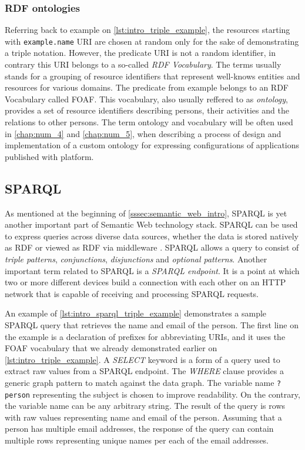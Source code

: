 \subsubsection{RDF ontologies}

Referring back to example on  \autoref{lst:intro_triple_example}, the resources starting with \texttt{example.name} URI are chosen at random only for the sake of demonstrating a triple notation. However, the predicate URI is not a random identifier, in contrary this URI belongs to a so-called \textit{RDF Vocabulary}. The terms usually stands  for a grouping of resource identifiers that represent well-knows entities and resources for various domains. The predicate from example belongs to an RDF Vocabulary called \gls{FOAF}. This vocabulary, also usually reffered  to as \textit{ontology}, provides a set of resource identifiers describing persons, their activities and the relations to other persons. The term ontology and vocabulary will be often used in \autoref{chap:num_4} and \autoref{chap:num_5}, when describing a process of design and implementation of a custom ontology for expressing configurations of applications published with \lpa{} platform.

\subsection{SPARQL}

As mentioned at the beginning of \autoref{sssec:semantic_web_intro}, SPARQL is yet another important part of Semantic Web technology stack. SPARQL can be used to express queries across diverse data sources, whether the data is stored natively as RDF or viewed as RDF via middleware \cite{sparql_main_spec}\cite{sparql_specs}. SPARQL allows a query to consist of \textit{triple patterns}, \textit{conjunctions}, \textit{disjunctions} and \textit{optional patterns}. Another important term related to SPARQL is a \textit{SPARQL endpoint}. It is a point  at which two or more different devices build a connection with each other on an HTTP network that is capable of receiving and processing SPARQL requests.

An example of \autoref{lst:intro_sparql_triple_example} demonstrates a sample SPARQL query that retrieves the name and email of the person. The first line on the example is a declaration of prefixes for abbreviating URIs, and it uses the FOAF vocabulary that we already demonstrated earlier on \autoref{lst:intro_triple_example}. A \textit{SELECT} keyword is a form of a query used to extract raw values from a SPARQL endpoint. The \textit{WHERE} clause provides a generic graph pattern to match against the data graph. The variable name \texttt{?person} representing the subject is chosen to improve readability. On the contrary, the variable name can be any arbitrary string. The result of the query is rows with raw values representing name and email of the person. Assuming that a person has multiple email addresses, the response of the query can contain multiple rows representing unique names per each of the email addresses. 


